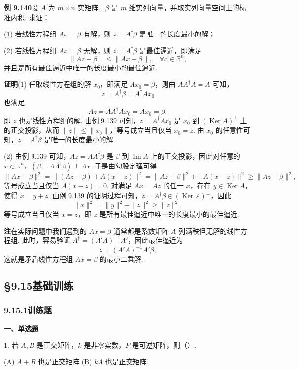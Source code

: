 \documentclass[UTF8, 12pt, fontset=fandol, oneside]{ctexart}
\begin{document}
\noindent\textbf{例 9.140}\quad 设 $A$ 为 $m\times n$ 实矩阵，$\beta$ 是 $m$ 维实列向量，并取实列向量空间上的标准内积. 求证：

(1) 若线性方程组 $Ax=\beta$ 有解，则 $z=A^\dagger\beta$ 是唯一的长度最小的解；

(2) 若线性方程组 $Ax=\beta$ 无解，则 $z=A^\dagger\beta$ 是最佳逼近，即满足
\[
\|Az-\beta\|\le\|Ax-\beta\|,\quad \forall x\in\mathbb{R}^n,
\]
并且是所有最佳逼近中唯一的长度最小的最佳逼近.

\noindent\textbf{证明}\quad (1) 任取线性方程组的解 $x_0$，即满足 $Ax_0=\beta$，则由 $AA^\dagger A=A$ 可知，
\[
z=A^\dagger\beta=A^\dagger Ax_0
\]
也满足
\[
Az=AA^\dagger Ax_0=Ax_0=\beta,
\]
即 $z$ 也是线性方程组的解. 由例 9.139 可知，$z=A^\dagger Ax_0$ 是 $x_0$ 到 $(\operatorname{Ker}A)^\perp$ 上的正交投影，从而 $\|z\|\le\|x_0\|$，等号成立当且仅当 $x_0=z$. 由 $x_0$ 的任意性可知，$z=A^\dagger\beta$ 是唯一的长度最小的解.

(2) 由例 9.139 可知，$Az=AA^\dagger\beta$ 是 $\beta$ 到 $\operatorname{Im}A$ 上的正交投影，因此对任意的 $x\in\mathbb{R}^n$，$(\beta-AA^\dagger\beta)\perp Ax$. 于是由勾股定理可得
\[
\|Ax-\beta\|^2=\|(Az-\beta)+A(x-z)\|^2=\|Az-\beta\|^2+\|A(x-z)\|^2\ge\|Az-\beta\|^2,
\]
等号成立当且仅当 $A(x-z)=0$. 对满足 $Ax=Az$ 的任一 $x$，存在 $y\in\operatorname{Ker}A$，使得 $x=y+z$. 由例 9.139 的证明过程可知，$z=A^\dagger\beta\in(\operatorname{Ker}A)^\perp$，因此
\[
\|x\|^2=\|y\|^2+\|z\|^2\ge\|z\|^2,
\]
等号成立当且仅当 $x=z$，即 $z$ 是所有最佳逼近中唯一的长度最小的最佳逼近.

\noindent\textbf{注}\quad 在实际问题中我们遇到的 $Ax=\beta$ 通常都是系数矩阵 $A$ 列满秩但无解的线性方程组. 此时，容易验证 $A^\dagger=(A'A)^{-1}A'$，因此最佳逼近为
\[
z=(A'A)^{-1}A'\beta,
\]
这就是矛盾线性方程组 $Ax=\beta$ 的最小二乘解.

\subsection*{§9.15\quad 基础训练}

\subsubsection*{9.15.1\quad 训练题}

\noindent\textbf{一、单选题}

1. 若 $A,B$ 是正交矩阵，$k$ 是非零实数，$P$ 是可逆矩阵，则（\quad ）.

(A) $A+B$ 也是正交矩阵 \qquad (B) $kA$ 也是正交矩阵
\end{document}
